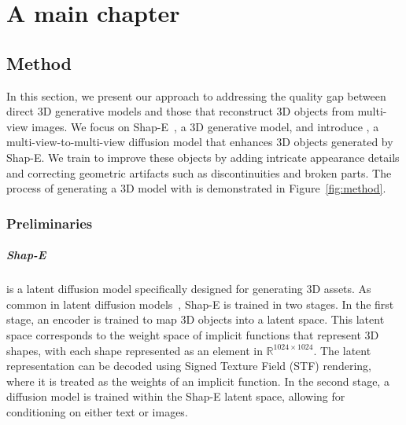 \chapter{A main chapter}
\label{chap:firstchap}

\section{Method}
In this section, we present our approach to addressing the quality gap between direct 3D generative models and those that reconstruct 3D objects from multi-view images.
We focus on Shap-E~\cite{jun2023shape}, a 3D generative model, and introduce \emph{\ourname}, a multi-view-to-multi-view diffusion model that enhances 3D objects generated by Shap-E. We train \ourname{} to improve these objects by adding intricate appearance details and correcting geometric artifacts such as discontinuities and broken parts.
The process of generating a 3D model with \ourname{} is demonstrated in Figure~\ref{fig:method}.

\subsection{Preliminaries}

\paragraph{Shap-E} 
is a latent diffusion model specifically designed for generating 3D assets. As common in latent diffusion models~\cite{rombach2022highresolutionimagesynthesislatent}, Shap-E is trained in two stages. In the first stage, an encoder is trained to map 3D objects into a latent space. This latent space corresponds to the weight space of implicit functions that represent 3D shapes, with each shape represented as an element in $\mathbb{R}^{1024\times1024}$. The latent representation can be decoded using Signed Texture Field (STF) rendering, where it is treated as the weights of an implicit function.
In the second stage, a diffusion model is trained within the Shap-E latent space, allowing for conditioning on either text or images.

